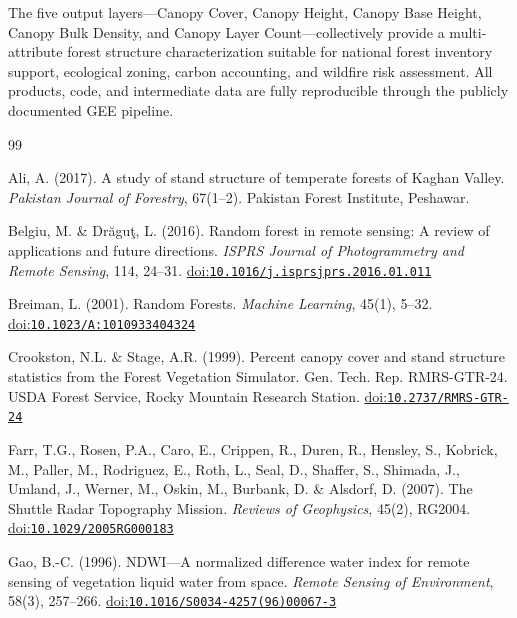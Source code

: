 \documentclass[12pt,a4paper,twoside]{article}
\makeatletter
\providecommand{\doi}[1]{%
  \begingroup
  \let\bibinfo\@secondoftwo
  \urlstyle{rm}%
  \href{https://doi.org/#1}{doi:\nolinkurl{#1}}%
  \endgroup
}
\makeatother
\begin{document}
The five output layers---Canopy Cover, Canopy Height, Canopy Base Height, Canopy
Bulk Density, and Canopy Layer Count---collectively provide a multi-attribute forest
structure characterization suitable for national forest inventory support, ecological
zoning, carbon accounting, and wildfire risk assessment.  All products, code, and
intermediate data are fully reproducible through the publicly documented GEE
pipeline.

\begin{thebibliography}{99}

Ali, A. (2017).
\newblock A study of stand structure of temperate forests of Kaghan Valley.
\newblock \textit{Pakistan Journal of Forestry}, 67(1--2).
\newblock Pakistan Forest Institute, Peshawar.

Belgiu, M. \& Dr\u{a}gu\c{t}, L. (2016).
\newblock Random forest in remote sensing: A review of applications and future
  directions.
\newblock \textit{ISPRS Journal of Photogrammetry and Remote Sensing}, 114,
  24--31.
\newblock \doi{10.1016/j.isprsjprs.2016.01.011}

Breiman, L. (2001).
\newblock Random Forests.
\newblock \textit{Machine Learning}, 45(1), 5--32.
\newblock \doi{10.1023/A:1010933404324}

Crookston, N.L. \& Stage, A.R. (1999).
\newblock Percent canopy cover and stand structure statistics from the Forest
  Vegetation Simulator.
\newblock Gen. Tech. Rep. RMRS-GTR-24. USDA Forest Service, Rocky Mountain
  Research Station.
\newblock \doi{10.2737/RMRS-GTR-24}

Farr, T.G., Rosen, P.A., Caro, E., Crippen, R., Duren, R., Hensley, S.,
  Kobrick, M., Paller, M., Rodriguez, E., Roth, L., Seal, D., Shaffer, S.,
  Shimada, J., Umland, J., Werner, M., Oskin, M., Burbank, D. \& Alsdorf, D.
  (2007).
\newblock The Shuttle Radar Topography Mission.
\newblock \textit{Reviews of Geophysics}, 45(2), RG2004.
\newblock \doi{10.1029/2005RG000183}

Gao, B.-C. (1996).
\newblock NDWI---A normalized difference water index for remote sensing of
  vegetation liquid water from space.
\newblock \textit{Remote Sensing of Environment}, 58(3), 257--266.
\newblock \doi{10.1016/S0034-4257(96)00067-3}


\end{thebibliography}
\end{document}
